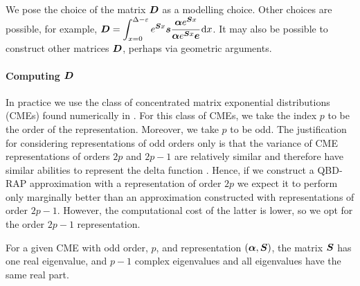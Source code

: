 We pose the choice of the matrix \(\boldsymbol D\) as a modelling choice. Other choices are possible, for example, \(\displaystyle \boldsymbol D = \int_{x=0}^{\Delta-\varepsilon}e^{\boldsymbol S x }\boldsymbol s \cfrac{\boldsymbol\alpha e^{ \boldsymbol Sx } }{\boldsymbol\alpha e^{ \boldsymbol Sx } \boldsymbol e}\, \mathrm{d} x\). It may also be possible to construct other matrices \(\boldsymbol D\), perhaps via geometric arguments. 

\paragraph{Computing \(\boldsymbol D\)}
In practice we use the class of concentrated matrix exponential distributions (CMEs) found numerically in \citep{hht2020}. For this class of CMEs, we take the index \(p\) to be the order of the representation. Moreover, we take \(p\) to be odd. The justification for considering representations of odd orders only is that the variance of CME representations of orders \(2p\) and \(2p-1\) are relatively similar and therefore have similar abilities to represent the delta function \citep{hht2020}. Hence, if we construct a QBD-RAP approximation with a representation of order \(2p\) we expect it to perform only marginally better than an approximation constructed with representations of order \(2p-1\). However, the computational cost of the latter is lower, so we opt for the order \(2p-1\) representation. 

For a given CME with odd order, \(p\), and representation \((\boldsymbol\alpha,\boldsymbol S)\), the matrix \(\boldsymbol S\) has one real eigenvalue, and \(p-1\) complex eigenvalues and all eigenvalues have the same real part. 

